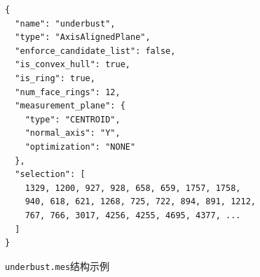 \begin{figure}[b]
\centering
\begin{minipage}{0.6\linewidth}
\begin{verbatim}
{
  "name": "underbust",
  "type": "AxisAlignedPlane",
  "enforce_candidate_list": false,
  "is_convex_hull": true,
  "is_ring": true,
  "num_face_rings": 12,
  "measurement_plane": {
    "type": "CENTROID",
    "normal_axis": "Y",
    "optimization": "NONE"
  },
  "selection": [
    1329, 1200, 927, 928, 658, 659, 1757, 1758, 
    940, 618, 621, 1268, 725, 722, 894, 891, 1212, 
    767, 766, 3017, 4256, 4255, 4695, 4377, ... 
  ]
}
\end{verbatim}
\end{minipage}

\caption{\texttt{underbust.mes}结构示例}
\label{fig:ch4-underbust-mes}
\end{figure}

